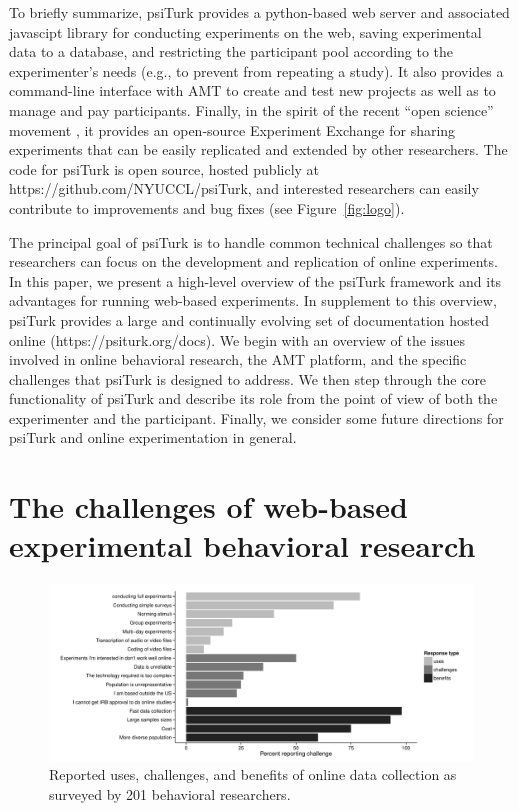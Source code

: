 \documentclass[twocolumn]{svjour3}          %
\newcommand{\psiturk}[0]{\textsf{psiTurk}}
\begin{document}
To briefly summarize, \psiturk{} provides a python-based web server and associated javascipt library for conducting 
experiments on the web, saving experimental data to a database, and restricting the 
participant pool according to the experimenter's needs (e.g., to prevent from repeating a study). 
It also provides a command-line interface with AMT to 
create and test new projects as well as to manage and pay participants. Finally, in 
the spirit of the recent ``open science'' movement \citep{Collaboration:2012vf},
it provides  an open-source Experiment Exchange for sharing experiments 
that can be easily replicated and extended by other researchers.  The code for 
\psiturk{} is open source, hosted publicly at
\textsf{https://github.com/NYUCCL/psiTurk}, and interested researchers can easily 
contribute to improvements and bug fixes (see Figure~\ref{fig:logo}).

The principal goal of \psiturk{} is to handle common technical 
challenges so that researchers can focus on the development and replication
of online experiments.  In this paper, we present a high-level overview of the 
\psiturk{} framework and its advantages for running web-based experiments.
In supplement to this overview, \psiturk{} provides a large and continually
evolving set of documentation hosted online (\textsf{https://psiturk.org/docs}).
We begin with an overview of the issues involved in online 
behavioral research,  the AMT platform, and the specific challenges that \psiturk{} is designed to 
address.  We then  step through the core functionality of \psiturk{} and 
describe its role from the point of view of both the experimenter and the participant.  Finally, we
consider some future directions for \psiturk{} and online experimentation in 
general.



\section{The challenges of web-based experimental behavioral research}

\begin{figure}[tp]
\centering
\includegraphics[width=\textwidth]{figures/combinedquestions2.pdf}
\caption{Reported uses, challenges, and benefits of online data collection as surveyed
by 201 behavioral researchers.}
\label{fig:survey}
\end{figure}
\end{document}
